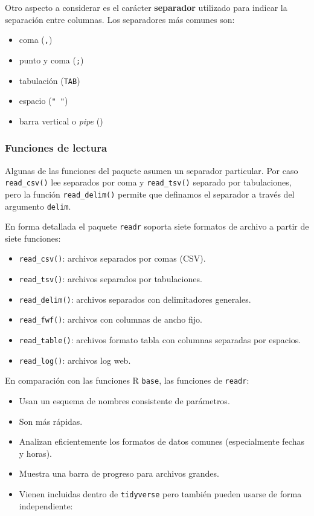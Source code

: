 \documentclass[
  spanish,
  letterpaper,
  DIV=11,
  numbers=noendperiod]{scrreprt}
\providecommand{\tightlist}{%
  \setlength{\itemsep}{0pt}\setlength{\parskip}{0pt}}
\begin{document}
Otro aspecto a considerar es el carácter \textbf{separador} utilizado
para indicar la separación entre columnas. Los separadores más comunes
son:

\begin{itemize}
\item
  coma (\texttt{,})
\item
  punto y coma (\texttt{;})
\item
  tabulación (\texttt{TAB})
\item
  espacio (\texttt{"\ "})
\item
  barra vertical o \emph{pipe} (\texttt{\textbar{}})
\end{itemize}

\subsubsection{Funciones de lectura}\label{funciones-de-lectura}

Algunas de las funciones del paquete asumen un separador particular. Por
caso \texttt{read\_csv()} lee separados por coma y \texttt{read\_tsv()}
separado por tabulaciones, pero la función \texttt{read\_delim()}
permite que definamos el separador a través del argumento
\texttt{delim}.

En forma detallada el paquete \texttt{readr} soporta siete formatos de
archivo a partir de siete funciones:

\begin{itemize}
\tightlist
\item
  \texttt{read\_csv()}: archivos separados por comas (CSV).
\item
  \texttt{read\_tsv()}: archivos separados por tabulaciones.
\item
  \texttt{read\_delim()}: archivos separados con delimitadores
  generales.
\item
  \texttt{read\_fwf()}: archivos con columnas de ancho fijo.
\item
  \texttt{read\_table()}: archivos formato tabla con columnas separadas
  por espacios.
\item
  \texttt{read\_log()}: archivos log web.
\end{itemize}

En comparación con las funciones R \texttt{base}, las funciones de
\texttt{readr}:

\begin{itemize}
\item
  Usan un esquema de nombres consistente de parámetros.
\item
  Son más rápidas.
\item
  Analizan eficientemente los formatos de datos comunes (especialmente
  fechas y horas).
\item
  Muestra una barra de progreso para archivos grandes.
\item
  Vienen incluidas dentro de \texttt{tidyverse} pero también pueden
  usarse de forma independiente:
\end{itemize}
\end{document}
